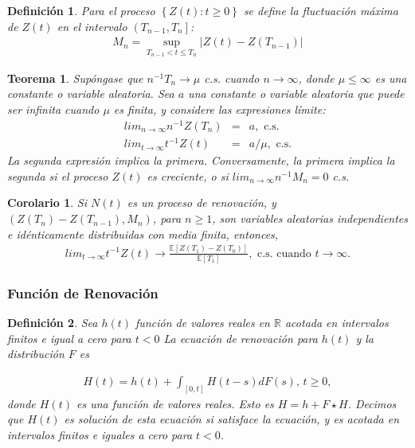 \documentclass{article}
\newtheorem{Def}{Definición}
\newtheorem{Teo}{Teorema}
\newtheorem{Coro}{Corolario}
\newcommand{\rea}{\mathbb{R}}
\newcommand{\esp}{\mathbb{E}}
\begin{document}
\begin{Def}
Para el proceso $\left\{Z\left(t\right):t\geq0\right\}$ se define la fluctuaci\'on m\'axima de $Z\left(t\right)$ en el intervalo $\left(T_{n-1},T_{n}\right]$:
\begin{eqnarray*}
M_{n}=\sup_{T_{n-1}<t\leq T_{n}}|Z\left(t\right)-Z\left(T_{n-1}\right)|
\end{eqnarray*}
\end{Def}

\begin{Teo}
Sup\'ongase que $n^{-1}T_{n}\rightarrow\mu$ c.s. cuando $n\rightarrow\infty$, donde $\mu\leq\infty$ es una constante o variable aleatoria. Sea $a$ una constante o variable aleatoria que puede ser infinita cuando $\mu$ es finita, y considere las expresiones l\'imite:
\begin{eqnarray}
lim_{n\rightarrow\infty}n^{-1}Z\left(T_{n}\right)&=&a,\textrm{ c.s.}\\
lim_{t\rightarrow\infty}t^{-1}Z\left(t\right)&=&a/\mu,\textrm{ c.s.}
\end{eqnarray}
La segunda expresi\'on implica la primera. Conversamente, la primera implica la segunda si el proceso $Z\left(t\right)$ es creciente, o si $lim_{n\rightarrow\infty}n^{-1}M_{n}=0$ c.s.
\end{Teo}

\begin{Coro}
Si $N\left(t\right)$ es un proceso de renovaci\'on, y $\left(Z\left(T_{n}\right)-Z\left(T_{n-1}\right),M_{n}\right)$, para $n\geq1$, son variables aleatorias independientes e id\'enticamente distribuidas con media finita, entonces,
\begin{eqnarray}
lim_{t\rightarrow\infty}t^{-1}Z\left(t\right)\rightarrow\frac{\esp\left[Z\left(T_{1}\right)-Z\left(T_{0}\right)\right]}{\esp\left[T_{1}\right]},\textrm{ c.s. cuando  }t\rightarrow\infty.
\end{eqnarray}
\end{Coro}


%
\subsubsection{Funci\'on de Renovaci\'on}
%


\begin{Def}
Sea $h\left(t\right)$ funci\'on de valores reales en $\rea$ acotada en intervalos finitos e igual a cero para $t<0$ La ecuaci\'on de renovaci\'on para $h\left(t\right)$ y la distribuci\'on $F$ es

\begin{eqnarray}%
H\left(t\right)=h\left(t\right)+\int_{\left[0,t\right]}H\left(t-s\right)dF\left(s\right)\textrm{,    }t\geq0,
\end{eqnarray}
donde $H\left(t\right)$ es una funci\'on de valores reales. Esto es $H=h+F\star H$. Decimos que $H\left(t\right)$ es soluci\'on de esta ecuaci\'on si satisface la ecuaci\'on, y es acotada en intervalos finitos e iguales a cero para $t<0$.
\end{Def}
\end{document}
